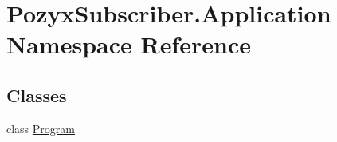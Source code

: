 \hypertarget{namespace_pozyx_subscriber_1_1_application}{}\section{Pozyx\+Subscriber.\+Application Namespace Reference}
\label{namespace_pozyx_subscriber_1_1_application}
\subsection*{Classes}
\begin{DoxyCompactItemize}
\item 
class \hyperlink{class_pozyx_subscriber_1_1_application_1_1_program}{Program}
\end{DoxyCompactItemize}
